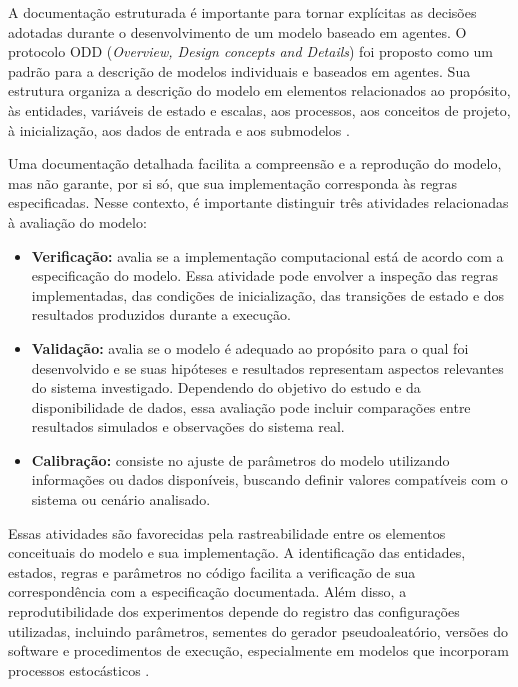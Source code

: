 A documentação estruturada é importante para tornar explícitas as decisões adotadas durante o desenvolvimento de um modelo baseado em agentes. O protocolo ODD (\textit{Overview, Design concepts and Details}) foi proposto como um padrão para a descrição de modelos individuais e baseados em agentes. Sua estrutura organiza a descrição do modelo em elementos relacionados ao propósito, às entidades, variáveis de estado e escalas, aos processos, aos conceitos de projeto, à inicialização, aos dados de entrada e aos submodelos \cite{Grimm2010}.

Uma documentação detalhada facilita a compreensão e a reprodução do modelo, mas não garante, por si só, que sua implementação corresponda às regras especificadas. Nesse contexto, é importante distinguir três atividades relacionadas à avaliação do modelo:

\begin{itemize}
    \item \textbf{Verificação:} avalia se a implementação computacional está de acordo com a especificação do modelo. Essa atividade pode envolver a inspeção das regras implementadas, das condições de inicialização, das transições de estado e dos resultados produzidos durante a execução.

    \item \textbf{Validação:} avalia se o modelo é adequado ao propósito para o qual foi desenvolvido e se suas hipóteses e resultados representam aspectos relevantes do sistema investigado. Dependendo do objetivo do estudo e da disponibilidade de dados, essa avaliação pode incluir comparações entre resultados simulados e observações do sistema real.

    \item \textbf{Calibração:} consiste no ajuste de parâmetros do modelo utilizando informações ou dados disponíveis, buscando definir valores compatíveis com o sistema ou cenário analisado.
\end{itemize}

Essas atividades são favorecidas pela rastreabilidade entre os elementos conceituais do modelo e sua implementação. A identificação das entidades, estados, regras e parâmetros no código facilita a verificação de sua correspondência com a especificação documentada. Além disso, a reprodutibilidade dos experimentos depende do registro das configurações utilizadas, incluindo parâmetros, sementes do gerador pseudoaleatório, versões do software e procedimentos de execução, especialmente em modelos que incorporam processos estocásticos \cite{Taillandier2019,garcias_2024}.
